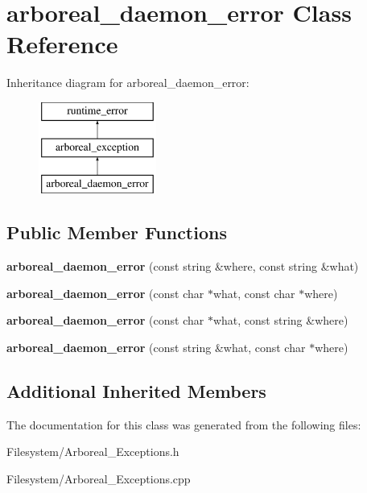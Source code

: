 \hypertarget{classarboreal__daemon__error}{}\section{arboreal\+\_\+daemon\+\_\+error Class Reference}
\label{classarboreal__daemon__error}
Inheritance diagram for arboreal\+\_\+daemon\+\_\+error\+:\begin{figure}[H]
\begin{center}
\leavevmode
\includegraphics[height=3.000000cm]{classarboreal__daemon__error}
\end{center}
\end{figure}
\subsection*{Public Member Functions}
\begin{DoxyCompactItemize}
\item 
\mbox{\label{classarboreal__daemon__error_a37da6c1aa2facc78642ec83acedf4740}} 
{\bfseries arboreal\+\_\+daemon\+\_\+error} (const string \&where, const string \&what)
\item 
\mbox{\label{classarboreal__daemon__error_a1a73b184803ecb5409268563a127b135}} 
{\bfseries arboreal\+\_\+daemon\+\_\+error} (const char $\ast$what, const char $\ast$where)
\item 
\mbox{\label{classarboreal__daemon__error_a0f1b9b6d267f937aa8da0ea970aca4f4}} 
{\bfseries arboreal\+\_\+daemon\+\_\+error} (const char $\ast$what, const string \&where)
\item 
\mbox{\label{classarboreal__daemon__error_a535558a3788877526a7eaa653af397b7}} 
{\bfseries arboreal\+\_\+daemon\+\_\+error} (const string \&what, const char $\ast$where)
\end{DoxyCompactItemize}
\subsection*{Additional Inherited Members}


The documentation for this class was generated from the following files\+:\begin{DoxyCompactItemize}
\item 
Filesystem/Arboreal\+\_\+\+Exceptions.\+h\item 
Filesystem/Arboreal\+\_\+\+Exceptions.\+cpp\end{DoxyCompactItemize}
